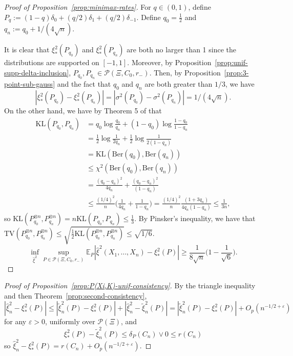 \documentclass{article}
\theoremstyle{definition}
\newcommand*\eps{\epsilon}
\renewcommand*\epsilon{\varepsilon}
\newcommand{\1}{\mathbbm{1}}
\begin{document}
\begin{proof}[Proof of Proposition~\ref{prop:minimax-rates}]
    For $q \in (0, 1)$, define $P_q := (1 - q)\delta_0 + (q/2)\delta_1 + (q/2)\delta_{-1}$. Define $q_0 = \frac{1}{2}$ and $q_n := q_0 + 1/(4\sqrt n)$. 
    
    It is clear that $\xi^2_*(P_{q_0})$ and $\xi^2_*(P_{q_n})$ are both no larger than 1 since the distributions are supported on $[-1, 1]$. Moreover, by Proposition~\ref{prop:unif-supp-delta-inclusion}, $P_{q_0}, P_{q_n} \in \mathcal P(\Xi, C_0, r_-)$. Then, by Proposition~\ref{prop:3-point-sub-gauss} and the fact that $q_0$ and $q_n$ are both greater than $1/3$, we have
    \[
    |\xi_*^2(P_{q_0}) - \xi_*^2(P_{q_n})| = |\sigma^2(P_{q_0}) - \sigma^2(P_{q_n})| =  1/(4\sqrt n).
    \]
    On the other hand, we have by Theorem 5 of \cite{gibbs2002choosingboundingprobabilitymetrics} that 
    \begin{align*}
        \text{KL}(P_{q_0}, P_{q_n}) &= q_0 \log \frac{q_0}{q_n} + (1-q_0)\log \frac{1-q_0}{1-q_n} \\
        &= \frac12 \log \frac{1}{2q_n} + \frac12 \log \frac{1}{2(1 - q_n)} \\ &= \text{KL}(\text{Ber}(q_0), \text{Ber}(q_n)) \\ 
        &\leq \chi^2(\text{Ber}(q_0), \text{Ber}(q_n)) \\
        &= \frac{(q_0 - q_n)^2}{4 q_n} + \frac{(q_0 - q_n)^2}{(1- q_n)} \\
        &\leq \frac{(1/4)^2}{n} \biggl( \frac{1}{4q_n} + \frac{1}{1-q_n}\biggr) = \frac{(1/4)^2}{n}\frac{ (1 + 3q_n)}{4 q_n(1 - q_n)} \leq \frac{1}{3n},
    \end{align*}
    so $\text{KL}(P_{q_0}^{\otimes n}, P_{q_n}^{\otimes n} ) = n\text{KL}(P_{q_0}, P_{q_n}) \leq \frac{1}{3}$. By Pinsker's inequality, we have that $\mathrm{TV}(P_{q_0}^{\otimes n}, P_{q_n}^{\otimes n}) \leq \sqrt{ \frac{1}{2} \mathrm{KL}( P_{q_0}^{\otimes n}, P_{q_n}^{\otimes n} )} \leq \sqrt{1/6}$. 
    \[
    \inf_{\hat \xi^2} \sup_{P \in \mathcal P(\Xi, C_0, r_-)} \mathbb E_P|\hat \xi^2(X_1, \dots, X_n) - \xi_*^2(P)| \geq \frac{1}{8\sqrt n}\biggl(1 - \frac{1}{\sqrt{6}}\biggr). 
    \]
\end{proof}
\begin{proof}[Proof of Proposition~\ref{prop:P(Xi,K)-unif-consistency}]
By the triangle inequality and then Theorem~\ref{prop:second-consistency},  
\[
|\hat \xi^2_n - \xi_*^2(P)| \leq |\tilde \xi^2_n(P) - \xi_*^2(P)| + |\hat \xi^2_n - \tilde \xi^2_n(P)|  = |\tilde \xi^2_n(P) - \xi_*^2(P)| + O_p(n^{-1/2 + \eps})
\]
for any $\eps > 0$, uniformly over $\mathcal P(\Xi)$, and 
\[
\xi_*^2(P) - \tilde \xi^2_n(P) \leq \delta_P(C_n) \vee 0 \leq r(C_n)
\]
so $\hat \xi^2_n - \xi_*^2(P) = r(C_n) + O_p(n^{-1/2 + \eps})$.
\end{proof}
\end{document}

